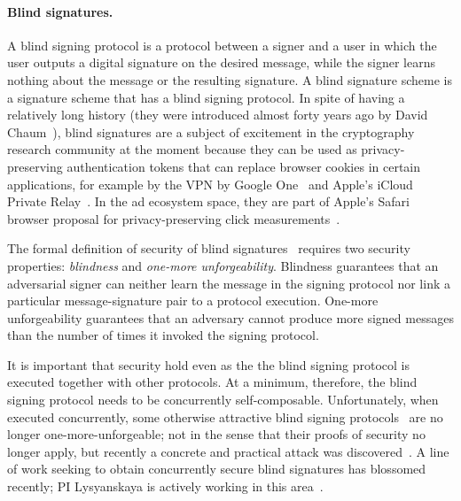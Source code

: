 \paragraph{Blind signatures.} A blind signing protocol is a protocol between a signer and a user in which the user outputs a digital signature on the desired message, while the signer learns nothing about the message or the resulting signature.
A blind signature scheme is a signature scheme that has a blind signing protocol.  In spite of having a relatively long history (they were introduced almost forty years ago by David Chaum~\cite{C:Chaum82}), blind signatures are a subject of excitement in the cryptography research community at the moment because they can be used as privacy-preserving authentication tokens that can replace browser cookies in certain applications, for example by the VPN by Google One~\cite{google-one-vpn} and Apple's iCloud Private Relay~\cite{apple-private-relay}. In the ad ecosystem space, they are part of 
Apple's Safari browser proposal for privacy-preserving click measurements~\cite{safari-clicks}.

The formal definition of security of blind signatures~\cite{JC:PoiSte00,C:JueLubOst97,RSA:AbdNamNev06,JC:SchUnr17} requires two security properties: \emph{blindness} and \emph{one-more unforgeability}. Blindness guarantees that an adversarial signer can neither learn the message in the signing protocol nor link a particular message-signature pair to a protocol execution.  One-more unforgeability guarantees that an adversary cannot produce more signed messages than the number of times it invoked the signing protocol.  

It is important that security hold even as the the blind signing protocol is executed together with other protocols.  At a minimum, therefore, the blind signing protocol needs to be concurrently self-composable.
Unfortunately, when executed concurrently, some otherwise attractive blind signing protocols~\cite{C:Okamoto92,ICICS:Schnorr01,C:AbeOka00,C:Brands93,paquin2013u-prove,CCS:BalLys13,SP:STVWJG16,cryptoeprint:2017:682,JC:GJKR07} are no longer one-more-unforgeable; not in the sense that their proofs of security no longer apply, but recently a concrete and practical attack was discovered~\cite{EC:BLLOR21}. 
A line of work seeking to obtain concurrently secure blind signatures has blossomed recently; PI Lysyanskaya is actively working in this area~\cite{}.

